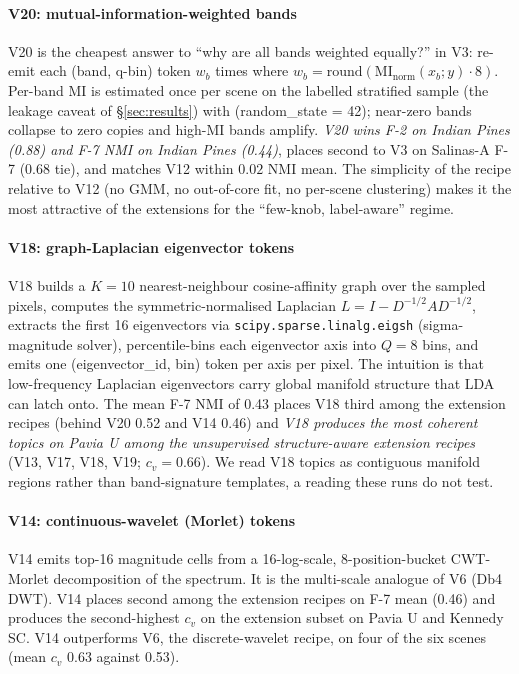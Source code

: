 \documentclass[journal,a4paper,10pt]{IEEEtran}
\begin{document}
\paragraph{V20: mutual-information-weighted bands}
V20 is the cheapest answer to ``why are all bands weighted equally?''
in V3: re-emit each (band, q-bin) token $w_b$ times where
$w_b = \mathrm{round}(\mathrm{MI}_{\mathrm{norm}}(x_b; y) \cdot 8)$.
Per-band MI is estimated once per scene on the labelled stratified
sample (the leakage caveat of \S\ref{sec:results}) with
(random\_state = 42); near-zero bands collapse to zero copies and
high-MI bands amplify. \emph{V20 wins F-2 on Indian Pines (0.88) and
F-7 NMI on Indian Pines (0.44)}, places second to V3 on Salinas-A F-7
(0.68 tie), and matches V12 within $0.02$ NMI mean. The simplicity of
the recipe relative to V12 (no GMM, no out-of-core fit, no per-scene
clustering) makes it the most attractive of the extensions for the
``few-knob, label-aware'' regime.

\paragraph{V18: graph-Laplacian eigenvector tokens}
V18 builds a $K=10$ nearest-neighbour cosine-affinity graph over the
sampled pixels, computes the symmetric-normalised Laplacian
$L = I - D^{-1/2}AD^{-1/2}$, extracts the first 16 eigenvectors via
\texttt{scipy.sparse.linalg.eigsh} (sigma-magnitude solver),
percentile-bins each eigenvector axis into $Q = 8$ bins, and emits
one (eigenvector\_id, bin) token per axis per pixel. The intuition is
that low-frequency Laplacian eigenvectors carry global manifold
structure that LDA can latch onto. The mean F-7 NMI of 0.43 places
V18 third among the extension recipes (behind V20 0.52 and V14 0.46) and
\emph{V18 produces the most coherent topics on Pavia U among the
unsupervised structure-aware extension recipes} (V13, V17, V18, V19; $c_v = 0.66$). We read V18 topics as
contiguous manifold regions rather than band-signature templates, a
reading these runs do not test.

\paragraph{V14: continuous-wavelet (Morlet) tokens}
V14 emits top-16 magnitude cells from a 16-log-scale, 8-position-bucket
CWT-Morlet decomposition of the spectrum. It is the multi-scale
analogue of V6 (Db4 DWT). V14 places second among the extension recipes on
F-7 mean (0.46) and produces the second-highest $c_v$ on the extension
subset on Pavia U and Kennedy SC. V14 outperforms V6, the
discrete-wavelet recipe, on four of the six scenes (mean $c_v$ 0.63
against 0.53).
\end{document}
